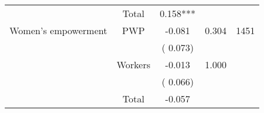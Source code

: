 \begin{tabular}{l*{4}{c}}
\cmidrule{2-3}
                               &       Total           &              0.158***               &   &                                               \\ 
\cmidrule{2-3}
 Women's empowerment                &       PWP     &             -0.081               &        0.304   & 1451                              \\ 
                               &                               &       (       0.073)                     & &                                                                             \\ 
                               &       Workers         &             -0.013               &        1.000   &                                               \\ 
                               &                               &       (       0.066)                     & &                                                                             \\ 
\cmidrule{2-3}
                               &       Total           &             -0.057               &   &                                               \\ 
\cmidrule{2-3}
\hline \end{tabular}                                                                                                              